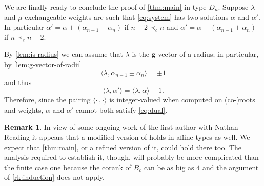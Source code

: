 \documentclass[11pt]{amsart}
\newcommand{\bg}{\mathbf{g}}
\theoremstyle{definition}
\newtheorem{remark}[theorem]{Remark}
\numberwithin{equation}{section}
\numberwithin{figure}{section}
\begin{document}
  We are finally ready to conclude the proof of \cref{thm:main} in type $D_n$.
  Suppose $\lambda$ and $\mu$ exchangeable weights are such that \cref{eq:system} has two solutions $\alpha$ and $\alpha'$.
  In particular $\alpha' = \alpha \pm (\alpha_{n-1}-\alpha_n)$ if $n-2 \prec_c n$ and $\alpha' = \alpha \pm (\alpha_{n-1}+\alpha_n)$ if $n \prec_c n-2$.
  
  By \cref{lem:is-radius} we can assume that $\lambda$ is the $\bg$-vector of a radius; in particular, by \cref{lem:g-vector-of-radii}
  \[
    \langle \lambda, \alpha_{n-1}\pm \alpha_n \rangle = \pm 1
  \]
  and thus
  \[
    \langle \lambda, \alpha' \rangle =
    \langle \lambda, \alpha \rangle \pm 1.
  \]
  Therefore, since the pairing $\langle\cdot\,,\cdot\rangle$ is integer-valued when computed on (co-)roots and weights, $\alpha$ and $\alpha'$ cannot both satisfy \cref{eq:dual}.

  \begin{remark}
    In view of some ongoing work of the first author with Nathan Reading it appears that a modified version of \cite[Propositions 5.1 and 5.2]{Ste13} holds in affine types as well.
    We expect that \cref{thm:main}, or a refined version of it, could hold there too.
    The analysis required to establish it, though, will probably be more complicated than the finite case one because the corank of $B_c$ can be as big as $4$ and the argument of \cref{rk:induction} does not apply.
  \end{remark}


%
%
\end{document}
